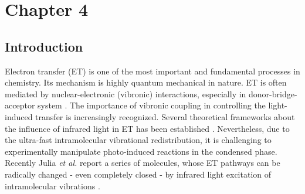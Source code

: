 \chapter{Chapter 4}\label{chap:chapt4}
\section{Introduction}

Electron transfer (ET) is one of the most important and fundamental processes in chemistry. Its mechanism
 is highly quantum mechanical in nature. ET is often mediated by nuclear-electronic (vibronic) interactions, especially in donor-bridge-acceptor system \cite{ulstrup1975effect,schrauben2010vibrational,davis2009effect,devault1980quantum,gray1996electron,lewis2002donor,bressler2009femtosecond,shih2008tryptophan,repp2010coherent,halpin2014two}. The importance of vibronic coupling in controlling the light-induced transfer is increasingly recognized. Several theoretical frameworks about the influence of infrared light in ET has been established \cite{soler2014signature,skourtis2004inelastic,xiao2009turning,beratan2009steering,antoniou2015vibrational}. Nevertheless, due to the ultra-fast intramolecular vibrational redistribution, it is challenging to experimentally manipulate photo-induced reactions in the condensed phase. Recently Julia {\em et al.} report a series of molecules, whose ET pathways can be radically changed - even completely closed - by infrared light excitation of intramolecular vibrations \cite{delor2014toward,delor2015mechanism,scattergood2014electron}.

